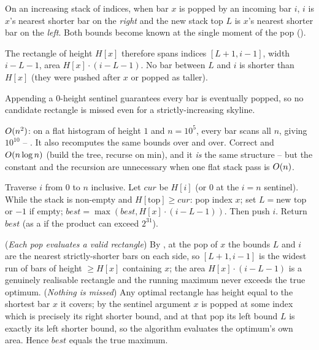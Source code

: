 \begin{observation}
On an increasing stack of indices, when bar $x$ is popped by an incoming bar $i$, $i$ is $x$'s nearest
shorter bar on the \emph{right} and the new stack top $L$ is $x$'s nearest shorter bar on the
\emph{left}. Both bounds become known at the single moment of the pop ().
\end{observation}
\begin{observation}
The rectangle of height $H[x]$ therefore spans indices $[L+1, i-1]$, width $i - L - 1$, area
$H[x]\cdot(i-L-1)$. No bar between $L$ and $i$ is shorter than $H[x]$ (they were pushed after $x$ or popped as taller).
\end{observation}
\begin{observation}
Appending a $0$-height sentinel guarantees every bar is eventually popped, so no candidate rectangle is
missed even for a strictly-increasing skyline.
\end{observation}

\begin{thinkbox}
{$O(n^2)$: on a flat histogram of height $1$ and $n=10^5$, every bar scans all $n$, giving $10^{10}$
-- \tle. It also recomputes the same bounds over and over.}
{Correct and $O(n\log n)$ (build the tree, recurse on min), and it \emph{is} the same structure --
but the constant and the recursion are unnecessary when one flat stack pass is $O(n)$.}
\end{thinkbox}

Traverse $i$ from $0$ to $n$ inclusive. Let $\mathit{cur}$ be $H[i]$ (or $0$ at the $i=n$ sentinel). While
the stack is non-empty and $H[\text{top}] \ge \mathit{cur}$: pop index $x$; set $L = \text{new top}$ or
$-1$ if empty; $\mathit{best} = \max(\mathit{best}, H[x]\cdot(i - L - 1))$. Then push $i$. Return
$\mathit{best}$ (as a  if the product can exceed $2^{31}$).

\begin{proofbox}
(\emph{Each pop evaluates a valid rectangle}) By , at the pop of $x$ the bounds $L$ and
$i$ are the nearest strictly-shorter bars on each side, so $[L+1, i-1]$ is the widest run of bars of
height $\ge H[x]$ containing $x$; the area $H[x]\cdot(i-L-1)$ is a genuinely realisable rectangle and the
running maximum never exceeds the true optimum. (\emph{Nothing is missed}) Any optimal rectangle has
height equal to the shortest bar $x$ it covers; by the sentinel argument $x$ is popped at some index
which is precisely its right shorter bound, and at that pop its left bound $L$ is exactly its left
shorter bound, so the algorithm evaluates the optimum's own area. Hence $\mathit{best}$ equals the true
maximum. \end{proofbox}

